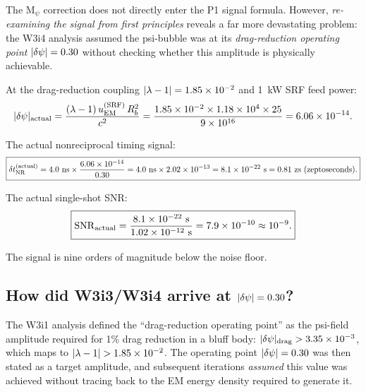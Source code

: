 \begin{tcolorbox}[colback=red!5!white, colframe=red!70!black,
  title=\textbf{CRITICAL FINDING: The 4.0 ns Signal Collapses --- Not From M$_\psi$
  But From Energy Density}]
The M$_\psi$ correction does not directly enter the P1 signal formula.
However, \emph{re-examining the signal from first principles} reveals a far
more devastating problem: the W3i4 analysis assumed the psi-bubble was at its
\emph{drag-reduction operating point} $|\delta\psi| = 0.30$ without checking
whether this amplitude is physically achievable.

At the drag-reduction coupling $|\lambda - 1| = 1.85\times 10^{-2}$ and 1~kW SRF feed power:
\begin{equation}
|\delta\psi|_{\rm actual} = \frac{(\lambda-1)\,u_{\rm EM}^{(\rm SRF)}\,R_b^2}{c^2}
= \frac{1.85\times 10^{-2} \times 1.18\times 10^{4} \times 25}{9\times 10^{16}}
= 6.06\times 10^{-14}.
\label{eq:dpsi_actual_box}
\end{equation}

The actual nonreciprocal timing signal:
\begin{equation}
\boxed{
\delta t_{\rm NR}^{(\rm actual)} = 4.0~\text{ns} \times \frac{6.06\times 10^{-14}}{0.30}
= 4.0~\text{ns} \times 2.02\times 10^{-13} = 8.1\times 10^{-22}~\text{s}
= 0.81~\text{zs (zeptoseconds)}.
}
\label{eq:signal_actual}
\end{equation}

The actual single-shot SNR:
\begin{equation}
\boxed{
\mathrm{SNR}_{\rm actual} = \frac{8.1\times 10^{-22}~\text{s}}{1.02\times 10^{-12}~\text{s}}
= 7.9\times 10^{-10} \approx 10^{-9}.
}
\label{eq:SNR_actual}
\end{equation}

The signal is nine orders of magnitude below the noise floor.
\end{tcolorbox}

\subsection{How did W3i3/W3i4 arrive at $|\delta\psi| = 0.30$?}
\label{ssec:how_030}

The W3i1 analysis defined the ``drag-reduction operating point'' as the
psi-field amplitude required for 1\% drag reduction in a bluff body:
$|\delta\psi|_{\rm drag} > 3.35\times 10^{-3}$, which maps to
$|\lambda - 1| > 1.85\times 10^{-2}$. The operating point $|\delta\psi| = 0.30$ was then stated
as a target amplitude, and subsequent iterations \emph{assumed} this value
was achieved without tracing back to the EM energy density required to
generate it.

